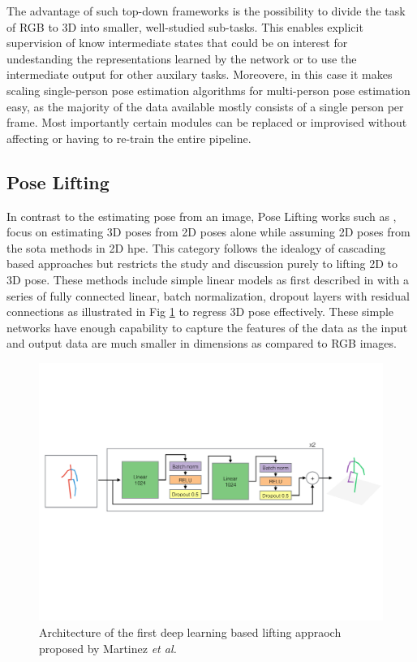 The advantage of such top-down frameworks is the possibility to divide the task of RGB to 3D into smaller, well-studied sub-tasks. This enables explicit supervision of know intermediate states that could be on interest for undestanding the representations learned by the network or to use the intermediate output for other auxilary tasks. Moreovere, in this case it makes scaling single-person pose estimation algorithms for multi-person pose estimation easy, as the majority of the data available mostly consists of a single person per frame. Most importantly certain modules can be replaced or improvised without affecting or having to re-train the entire pipeline.

\subsection{Pose Lifting}

In contrast to the estimating pose from an image, Pose Lifting works such as \cite{poselifter,  amazon1, repnet, c3dpo, unsupervisedAdversarial}, focus on estimating 3D poses from 2D poses alone while assuming 2D poses from the \ac{sota} methods in 2D \ac{hpe}. This category follows the idealogy of cascading based approaches but restricts the study and discussion purely to lifting 2D to 3D pose. These methods include simple linear models as first described in \cite{MartinezHRL17} with a series of fully connected linear, batch normalization, dropout layers with residual connections  as illustrated in Fig \ref{fig:lifting_arch} to regress 3D pose effectively. These simple networks have enough capability to capture the features of the data as the input and output data are much smaller in dimensions as compared to RGB images.

\begin{figure}[!h]
    \centering
    \includegraphics[width=\linewidth]{figures/background/lifting_arch.pdf}
    \caption{Architecture of the first deep learning based lifting appraoch proposed by Martinez \textit{et al.} \cite{MartinezHRL17}}
    \label{fig:lifting_arch}
\end{figure}

